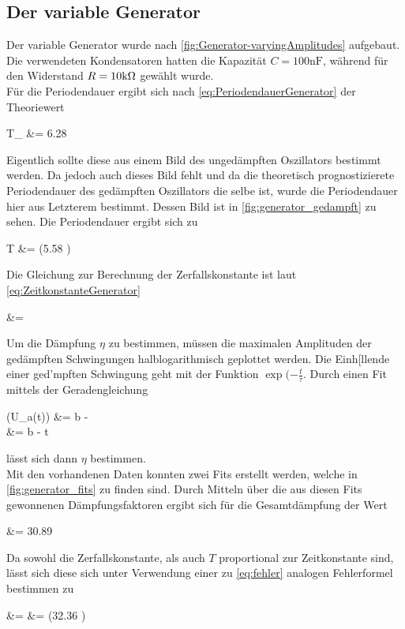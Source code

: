 \subsection{Der variable Generator}
Der variable Generator wurde nach \autoref{fig:Generator-varyingAmplitudes} aufgebaut. Die verwendeten Kondensatoren hatten die Kapazität $C = 100\text{nF}$, während für den Widerstand $R = 10\text{k$\Omega$}$ gewählt wurde.\\
Für die Periodendauer ergibt sich nach \autoref{eq:PeriodendauerGenerator} der Theoriewert 
\begin{aquation}
    T_ &= 6.28  \tp
\end{aquation}
Eigentlich sollte diese aus einem Bild des ungedämpften Oszillators bestimmt werden. Da jedoch auch dieses Bild fehlt und da die theoretisch prognostizierete Periodendauer des gedämpften Oszillators die selbe ist, wurde die Periodendauer hier aus Letzterem bestimmt. Dessen Bild ist in \autoref{fig:generator_gedampft} zu sehen. Die Periodendauer ergibt sich zu
\begin{aquation}
    T &= (5.58 )  \tp
\end{aquation}
Die Gleichung zur Berechnung der Zerfallskonstante ist laut \autoref{eq:ZeitkonstanteGenerator}
\begin{aquation}
    \tau &=  \tp
\end{aquation}
Um die Dämpfung $\eta$ zu bestimmen, müssen die maximalen Amplituden der gedämpften Schwingungen halblogarithmisch geplottet werden. Die Einh[llende einer ged'mpften Schwingung geht mit der Funktion $\exp(-\frac{t}{\tau}$. Durch einen Fit mittels der Geradengleichung 
\begin{aquation}
    \ln(U_a(t)) &= b -  \\
    &= b -  t
\end{aquation}
lässt sich dann $\eta$ bestimmen.\\
Mit den vorhandenen Daten konnten zwei Fits erstellt werden, welche in \autoref{fig:generator_fits} zu finden sind. Durch Mitteln über die aus diesen Fits gewonnenen Dämpfungsfaktoren ergibt sich für die Gesamtdämpfung der Wert 
\begin{aquation}
    \eta &= 30.89  \tp
\end{aquation}
Da sowohl die Zerfallskonstante, als auch $T$ proportional zur Zeitkonstante sind, lässt sich diese sich unter Verwendung einer zu \autoref{eq:fehler} analogen Fehlerformel bestimmen zu 
\begin{aquation}
    \tau &=  &= (32.36 ) \tp
\end{aquation}



